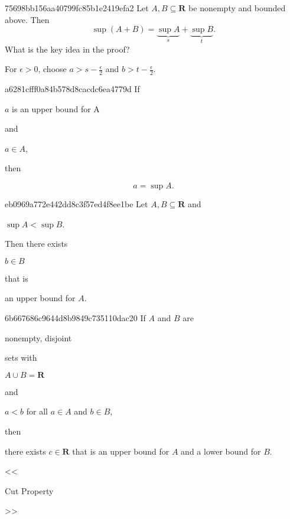 \begin{note}{75698bb156aa40799fc85b1e2419efa2}
    Let \({ A, B \subseteq \mathbf{R} }\) be nonempty and bounded above.
    Then
    \[
        \sup (A + B) = \underbrace{\sup A}_{s} + \underbrace{\sup B}_{t}.
    \]
    What is the key idea in the proof?

    \begin{cloze}{1}
        For \({ \epsilon > 0 }\), choose \({ a > s - \frac{\epsilon}{2} }\) and \({ b > t - \frac{\epsilon}{2} }\).
    \end{cloze}
\end{note}

\begin{note}{a6281cfff0a84b578d8cacdc6ea4779d}
    If \begin{icloze}{3}\({ a }\) is an upper bound for A\end{icloze} and \begin{icloze}{2}\({ a \in A }\),\end{icloze} then
    \begin{icloze}{1}
        \[
            a = \sup A.
        \]
    \end{icloze}
\end{note}

\begin{note}{eb0969a772e442dd8c3f57ed4f8ee1be}
    Let \({ A, B \subseteq \mathbf{R} }\) and \begin{icloze}{3}\({ \sup A < \sup B }\).\end{icloze} Then there exists \begin{icloze}{2}\({ b \in B }\)\end{icloze} that is \begin{icloze}{1}an upper bound for \({ A }\).\end{icloze}
\end{note}

\begin{note}{6b667686c9644d8b9849c735110dac20}
    If \({ A }\) and \({ B }\) are \begin{icloze}{5}nonempty, disjoint\end{icloze} sets with \begin{icloze}{3}\({ A \cup B = \mathbf{R} }\)\end{icloze} and \begin{icloze}{2}\({ a < b  }\) for all \({ a \in A }\) and \({ b \in B }\),\end{icloze} then \begin{icloze}{1}there exists \({ c \in \mathbf{R} }\) that is an upper bound for \({ A }\) and a lower bound for \({ B }\).\end{icloze}

    \begin{center}
        \tiny
        <<\begin{icloze}{4}Cut Property\end{icloze}>>
    \end{center}
\end{note}

